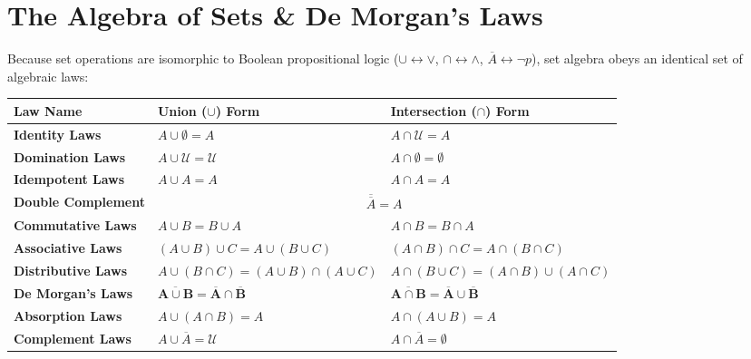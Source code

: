 \documentclass[11pt,a4paper]{article}
\begin{document}
\section{The Algebra of Sets \& De Morgan’s Laws}

Because set operations are isomorphic to Boolean propositional logic ($\cup \leftrightarrow \lor$, $\cap \leftrightarrow \land$, $\overline{A} \leftrightarrow \neg p$), set algebra obeys an identical set of algebraic laws:

\begin{center}
\renewcommand{\arraystretch}{1.25}
\begin{tabularx}{\textwidth}{l X X}
\toprule
\rowcolor{navy!10} \textbf{Law Name} & \textbf{Union ($\cup$) Form} & \textbf{Intersection ($\cap$) Form} \\
\midrule
\textbf{Identity Laws} & $A \cup \emptyset = A$ & $A \cap \mathcal{U} = A$ \\
\textbf{Domination Laws} & $A \cup \mathcal{U} = \mathcal{U}$ & $A \cap \emptyset = \emptyset$ \\
\textbf{Idempotent Laws} & $A \cup A = A$ & $A \cap A = A$ \\
\textbf{Double Complement} & \multicolumn{2}{c}{$\overline{\overline{A}} = A$} \\
\textbf{Commutative Laws} & $A \cup B = B \cup A$ & $A \cap B = B \cap A$ \\
\textbf{Associative Laws} & $(A \cup B) \cup C = A \cup (B \cup C)$ & $(A \cap B) \cap C = A \cap (B \cap C)$ \\
\textbf{Distributive Laws} & $A \cup (B \cap C) = (A \cup B) \cap (A \cup C)$ & $A \cap (B \cup C) = (A \cap B) \cup (A \cap C)$ \\
\textbf{De Morgan's Laws} & $\mathbf{\overline{A \cup B} = \overline{A} \cap \overline{B}}$ & $\mathbf{\overline{A \cap B} = \overline{A} \cup \overline{B}}$ \\
\textbf{Absorption Laws} & $A \cup (A \cap B) = A$ & $A \cap (A \cup B) = A$ \\
\textbf{Complement Laws} & $A \cup \overline{A} = \mathcal{U}$ & $A \cap \overline{A} = \emptyset$ \\
\bottomrule
\end{tabularx}
\end{center}
\end{document}
